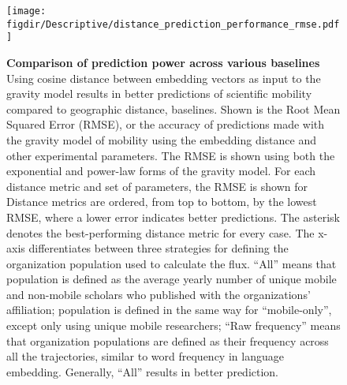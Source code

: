 \documentclass[12pt,a4paper]{article}
\def\figdir{../Figs}
\newcommand{\mycaption}[2]{%
  \caption[#1]{\textbf{#1} \small#2}%
}
\begin{document}
\clearpage
\begin{figure}[p!]
	\centering
	\texttt{[image: \\figdir/Descriptive/distance\_prediction\_performance\_rmse.pdf]}
		\mycaption
		{Comparison of prediction power across various baselines}
		{Using cosine distance between embedding vectors as input to the gravity model results in better predictions of scientific mobility compared to geographic distance, baselines.
		Shown is the Root Mean Squared Error (RMSE), or the accuracy of predictions made with the gravity model of mobility using the embedding distance and other experimental parameters.
		The RMSE is shown using both the exponential and power-law forms of the gravity model. 
		For each distance metric and set of parameters, the RMSE is shown for 
		Distance metrics are ordered, from top to bottom, by the lowest RMSE, where a lower error indicates better predictions. 
		The asterisk denotes the best-performing distance metric for every case. 
		The x-axis differentiates between three strategies for defining the organization population used to calculate the flux. 
		``All'' means that population is defined as the average yearly number of unique mobile and non-mobile scholars who published with the organizations' affiliation;
		population is defined in the same way for ``mobile-only'', except only using unique mobile researchers;
		``Raw frequency'' means that organization populations are defined as their frequency across all the trajectories, similar to word frequency in language embedding. 
		Generally, ``All'' results in better prediction.
		}
	\label{fig:supp:distancermse}
\end{figure}


\printbibliography{}
\end{document}
